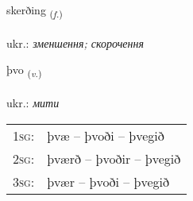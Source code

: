 \documentclass[frontgrid, backgrid]{flacards}\usepackage[]{graphicx}\usepackage[]{xcolor}
\begin{document}
\renewcommand{\flhead}{\vskip5pt \fboxsep=0pt {\small\bfseries\footnotesize Nafnorð | іменник}}
\renewcommand{\fcfoot}{\vskip5pt \fboxsep=0pt \hspace{2pt}{\small\bfseries\footnotesize 3K}}

\renewcommand{\blhead}{\vskip5pt {\small\bfseries\footnotesize Nafnorð | іменник }}
\renewcommand{\bcfoot}{\vskip5pt \hspace{2pt}{\small\bfseries\footnotesize 3K}}


{skerðing \small{\textsubscript{(\textit{f.})}} \\[1ex] %
\textphonetic{[scɛrðiŋk]} \\
ukr.: \emph{зменшення; скорочення} \\  [2ex]
\renewcommand*{\arraystretch}{0.8}
}

\renewcommand{\flhead}{\vskip5pt \fboxsep=0pt {\small\bfseries\footnotesize Sagnorð | дієслово}}
\renewcommand{\fcfoot}{\vskip5pt \fboxsep=0pt \hspace{2pt}{\small\bfseries\footnotesize 3K}}

\renewcommand{\blhead}{\vskip5pt {\small\bfseries\footnotesize Sagnorð | дієслово }}
\renewcommand{\bcfoot}{\vskip5pt \hspace{2pt}{\small\bfseries\footnotesize 3K}}


{þvo \small{\textsubscript{(\textit{v.})}} \\[1ex] %
\textphonetic{[θvɔː]} \\
ukr.: \emph{мити} \\  [2ex]
\renewcommand*{\arraystretch}{0.8}
\begin{tabular}{p{1cm}l}
\textsc{1sg}: & þvæ -- þvoði -- þvegið \\ 
\textsc{2sg}: & þværð -- þvoðir -- þvegið \\ 
\textsc{3sg}: & þvær -- þvoði -- þvegið \\ 
\end{tabular}
}
\end{document}

